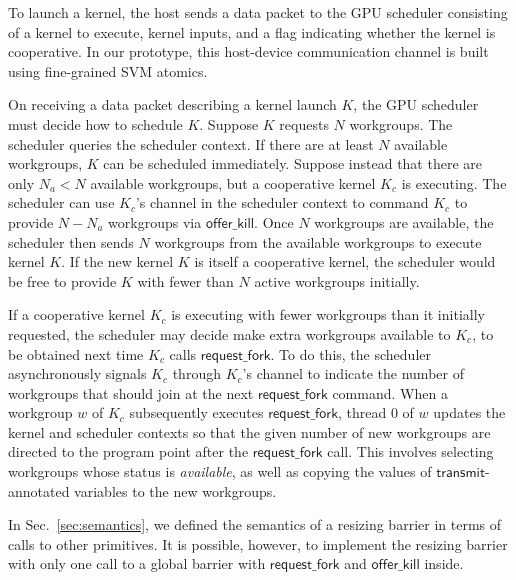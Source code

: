 \documentclass[sigconf]{acmart}
\newcommand{\KC}{\mathit{KC}}
\newcommand{\mysec}{Sec.~}
\newcommand{\transmit}{\mathsf{transmit}}
\newcommand{\offerfork}{\mathsf{request\_fork}}
\newcommand{\offerkill}{\mathsf{offer\_kill}}
\begin{document}
{
%
To launch a kernel, the host sends a data packet to the GPU scheduler
consisting of a kernel to execute, kernel inputs, and a flag
indicating whether the kernel is cooperative. In our prototype,
this host-device communication channel is built using fine-grained SVM
atomics.

On receiving a data packet describing a kernel launch $K$, the GPU
scheduler must decide how to schedule $K$. Suppose $K$ requests $N$
workgroups. The scheduler queries the scheduler context.  If there are
at least $N$ available workgroups, $K$ can be scheduled
immediately. Suppose instead that there are only $N_a < N$ available
workgroups, but a cooperative kernel $K_c$ is executing. The scheduler
can use $K_c$'s channel in the scheduler context to command $K_c$ to
provide $N - N_a$ workgroups via $\offerkill$.  Once $N$ workgroups
are available,
the scheduler then sends $N$ workgroups from the available workgroups
to execute kernel $K$.
If the new kernel $K$ is itself a cooperative kernel, the scheduler
would be free to provide $K$ with fewer than $N$ active workgroups
initially.

If a cooperative kernel $K_c$ is executing with fewer workgroups than
it initially requested, the scheduler may decide make extra workgroups
available to $K_c$, to be obtained next time $K_c$ calls $\offerfork$.
To do this, the scheduler asynchronously signals $K_c$ through $K_c$'s
channel to indicate the number of workgroups that should join at the
next $\offerfork$ command.  When a workgroup $w$ of $K_c$ subsequently
executes $\offerfork$, thread 0 of $w$ updates the kernel and
scheduler contexts so that the given number of new workgroups are
directed to the program point after the $\offerfork$ call.  This
involves selecting workgroups whose status is \emph{available}, as
well as copying the values of $\transmit$-annotated variables to the
new workgroups.

%
In \mysec\ref{sec:semantics}, we defined the semantics of a resizing
barrier in terms of calls to other primitives.  It is possible,
however, to implement the resizing barrier with only one call to a
global barrier with $\offerfork$ and $\offerkill$ inside.

}
\end{document}
